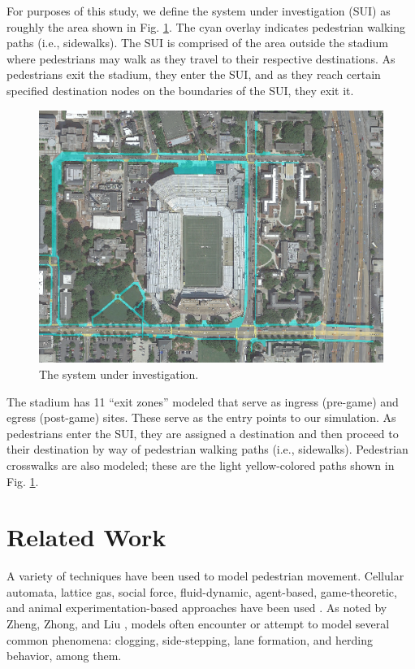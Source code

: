 \documentclass[12pt]{article}
\begin{document}
For purposes of this study, we define the system under investigation (SUI) as
roughly the area shown in Fig. \ref{fig:polygon}. The cyan overlay indicates
pedestrian walking paths (i.e., sidewalks). The SUI is comprised of the area
outside the stadium where pedestrians may walk as they travel to their
respective destinations. As pedestrians exit the stadium, they enter the SUI,
and as they reach certain specified destination nodes on the boundaries of the
SUI, they exit it.

\begin{figure}[H]
  \includegraphics[width=\linewidth,natwidth=1023,natheight=750]{GATechMap_20160301.png}
  \caption{The system under investigation.}
  \label{fig:polygon}
\end{figure}

The stadium has 11 ``exit zones'' modeled that serve as ingress (pre-game) and
egress (post-game) sites. These serve as the entry points to our simulation. As
pedestrians enter the SUI, they are assigned a destination and then proceed
to their destination by way of pedestrian walking paths (i.e., sidewalks).
Pedestrian crosswalks are also modeled; these are the light yellow-colored paths
shown in Fig. \ref{fig:polygon}.

\section{Related Work}
\label{sec:literature}

A variety of techniques have been used to model pedestrian movement. Cellular
automata, lattice gas, social force, fluid-dynamic, agent-based, game-theoretic,
and animal experimentation-based approaches have been used
\cite{zheng2009modeling}. As noted by Zheng, Zhong, and Liu
\cite{zheng2009modeling}, models often encounter or attempt to model several
common phenomena: clogging, side-stepping, lane formation, and herding
behavior, among them.
\end{document}

